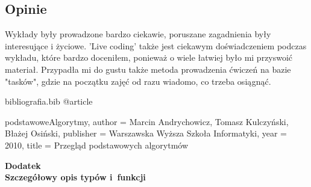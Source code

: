 \documentclass[12pt,a4paper]{article}
\begin{document}
\subsection{Opinie}
Wykłady były prowadzone bardzo ciekawie, poruszane zagadnienia były interesujące i życiowe. 'Live coding' także jest ciekawym doświadczeniem podczas wykładu, które bardzo doceniłem, ponieważ o wiele łatwiej było mi przyswoić materiał. Przypadła mi do gustu także metoda prowadzenia ćwiczeń na bazie "tasków", gdzie na początku zajęć od razu wiadomo, co
trzeba osiągnąć.

\begin{filecontents}{bibliografia.bib}
@article{podstawoweAlgorytmy,
	author = {Marcin Andrychowicz, Tomasz Kulczyński, Błażej Osiński},
	publisher = {Warszawska Wyższa Szkoła Informatyki},
	year = {2010},
	title = {Przegl\k{a}d podstawowych algorytm\'{o}w}

}
\end{filecontents}

\newpage




 
\newpage

\rule{0cm}{0cm}

\vfill

\begin{center}
\Huge\bfseries Dodatek\\Szczegółowy opis typów i~funkcji\par
\end{center}

\vfill 

\rule{0cm}{0cm}
\end{document}
